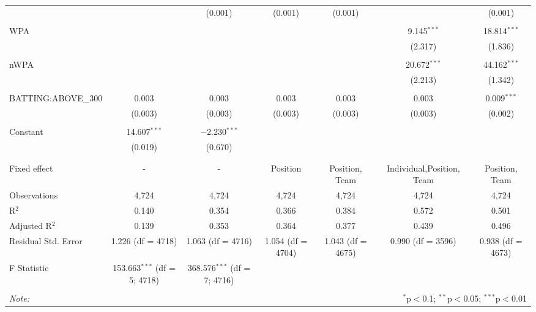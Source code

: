 \begin{table}[!htbp]
\begin{tabular}{@{\extracolsep{5pt}}lcccccc}
  &  & (0.001) & (0.001) & (0.001) &  & (0.001) \\
  & & & & & & \\
 WPA &  &  &  &  & 9.145$^{***}$ & 18.814$^{***}$ \\
  &  &  &  &  & (2.317) & (1.836) \\
  & & & & & & \\
 nWPA &  &  &  &  & 20.672$^{***}$ & 44.162$^{***}$ \\
  &  &  &  &  & (2.213) & (1.342) \\
  & & & & & & \\
 BATTING:ABOVE\_300 & 0.003 & 0.003 & 0.003 & 0.003 & 0.003 & 0.009$^{***}$ \\
  & (0.003) & (0.003) & (0.003) & (0.003) & (0.003) & (0.002) \\
  & & & & & & \\
 Constant & 14.607$^{***}$ & $-$2.230$^{***}$ &  &  &  &  \\
  & (0.019) & (0.670) &  &  &  &  \\
  & & & & & & \\
\hline \\[-1.8ex]
Fixed effect & - & - & Position & Position, Team & Individual,Position, Team & Position, Team \\
Observations & 4,724 & 4,724 & 4,724 & 4,724 & 4,724 & 4,724 \\
R$^{2}$ & 0.140 & 0.354 & 0.366 & 0.384 & 0.572 & 0.501 \\
Adjusted R$^{2}$ & 0.139 & 0.353 & 0.364 & 0.377 & 0.439 & 0.496 \\
Residual Std. Error & 1.226 (df = 4718) & 1.063 (df = 4716) & 1.054 (df = 4704) & 1.043 (df = 4675) & 0.990 (df = 3596) & 0.938 (df = 4673) \\
F Statistic & 153.663$^{***}$ (df = 5; 4718) & 368.576$^{***}$ (df = 7; 4716) &  &  &  &  \\
\hline
\hline \\[-1.8ex]
\textit{Note:}  & \multicolumn{6}{r}{$^{*}$p$<$0.1; $^{**}$p$<$0.05; $^{***}$p$<$0.01} \\
\end{tabular}
\end{table}
